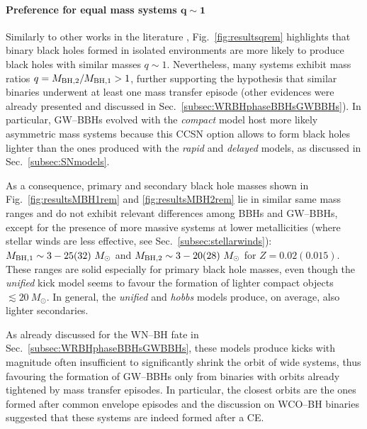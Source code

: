 \documentclass[a4paper,titlepage]{book}     	%
\newcommand{\sun}{\ensuremath{_\odot}}
\newcommand{\msun}{\ensuremath{M\sun}}
\begin{document}
\paragraph{Preference for equal mass systems $\boldsymbol{q \sim 1}$}Similarly to other works in the literature \cite{giacobbomapelli2018_mobse_fryer}, Fig.\ \ref{fig:resultsqrem} highlights that binary black holes formed in isolated environments are more likely to produce black holes with similar masses $q \sim 1$. Nevertheless, many systems exhibit mass ratios $q=M_{\rm BH,2}/M_{\rm BH,1} > 1$, further supporting the hypothesis that similar binaries underwent at least one mass transfer episode (other evidences were already presented and discussed in Sec.\ \ref{subsec:WRBHphaseBBHsGWBBHs}). In particular, GW--BBHs evolved with the \emph{compact} model host more likely asymmetric mass systems because this CCSN option allows to form black holes lighter than the ones produced with the \emph{rapid} and \emph{delayed} models, as discussed in Sec.\ \ref{subsec:SNmodels}.

As a consequence, primary and secondary black hole masses shown in Fig.\ \ref{fig:resultsMBH1rem} and \ref{fig:resultsMBH2rem} lie in similar same mass ranges and do not exhibit relevant differences among BBHs and GW--BBHs, except for the presence of more massive systems at lower metallicities (where stellar winds are less effective, see Sec.\ \ref{subsec:stellarwinds}):  $M_{\rm BH, 1} \sim 3-25 (32)~\msun$ and $M_{\rm BH,2} \sim 3-20 (28)~\msun$ for $Z=0.02 (0.015)$. These ranges are solid especially for primary black hole masses, even though the \emph{unified} kick model seems to favour the formation of lighter compact objects $\lesssim 20~\msun$. In general, the \emph{unified} and \emph{hobbs} models produce, on average, also lighter secondaries. 

As already discussed for the WN--BH fate in Sec.\ \ref{subsec:WRBHphaseBBHsGWBBHs}, these models produce kicks with magnitude often insufficient to significantly shrink the orbit of wide systems, thus favouring the formation of GW--BBHs only from binaries with orbits already tightened by mass transfer episodes. In particular, the closest orbits are the ones formed after common envelope episodes and the discussion on WCO--BH binaries suggested that these systems are indeed formed after a CE.
\end{document}
